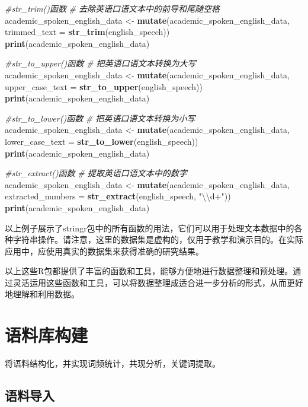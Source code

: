 \documentclass[]{book}
\newenvironment{Shaded}{\begin{snugshade}}{\end{snugshade}}
\newcommand{\CharTok}[1]{\textcolor[rgb]{0.31,0.60,0.02}{#1}}
\newcommand{\CommentTok}[1]{\textcolor[rgb]{0.56,0.35,0.01}{\textit{#1}}}
\newcommand{\DataTypeTok}[1]{\textcolor[rgb]{0.13,0.29,0.53}{#1}}
\newcommand{\KeywordTok}[1]{\textcolor[rgb]{0.13,0.29,0.53}{\textbf{#1}}}
\newcommand{\NormalTok}[1]{#1}
\newcommand{\StringTok}[1]{\textcolor[rgb]{0.31,0.60,0.02}{#1}}
\begin{document}
\begin{Shaded}
\begin{Highlighting}[]
\CommentTok{#str_trim()函数}
\CommentTok{# 去除英语口语文本中的前导和尾随空格}
\NormalTok{academic_spoken_english_data <-}\StringTok{ }\KeywordTok{mutate}\NormalTok{(academic_spoken_english_data, }\DataTypeTok{trimmed_text =} \KeywordTok{str_trim}\NormalTok{(english_speech))}
\KeywordTok{print}\NormalTok{(academic_spoken_english_data)}

\CommentTok{#str_to_upper()函数}
\CommentTok{# 把英语口语文本转换为大写}
\NormalTok{academic_spoken_english_data <-}\StringTok{ }\KeywordTok{mutate}\NormalTok{(academic_spoken_english_data, }\DataTypeTok{upper_case_text =} \KeywordTok{str_to_upper}\NormalTok{(english_speech))}
\KeywordTok{print}\NormalTok{(academic_spoken_english_data)}

\CommentTok{#str_to_lower()函数}
\CommentTok{# 把英语口语文本转换为小写}
\NormalTok{academic_spoken_english_data <-}\StringTok{ }\KeywordTok{mutate}\NormalTok{(academic_spoken_english_data, }\DataTypeTok{lower_case_text =} \KeywordTok{str_to_lower}\NormalTok{(english_speech))}
\KeywordTok{print}\NormalTok{(academic_spoken_english_data)}

\CommentTok{#str_extract()函数}
\CommentTok{# 提取英语口语文本中的数字}
\NormalTok{academic_spoken_english_data <-}\StringTok{ }\KeywordTok{mutate}\NormalTok{(academic_spoken_english_data, }\DataTypeTok{extracted_numbers =} \KeywordTok{str_extract}\NormalTok{(english_speech, }\StringTok{"}\CharTok{\textbackslash{}\textbackslash{}}\StringTok{d+"}\NormalTok{))}
\KeywordTok{print}\NormalTok{(academic_spoken_english_data)}
\end{Highlighting}
\end{Shaded}

以上例子展示了stringr包中的所有函数的用法，它们可以用于处理文本数据中的各种字符串操作。请注意，这里的数据集是虚构的，仅用于教学和演示目的。在实际应用中，应使用真实的数据集来获得准确的研究结果。

以上这些R包都提供了丰富的函数和工具，能够方便地进行数据整理和预处理。通过灵活运用这些函数和工具，可以将数据整理成适合进一步分析的形式，从而更好地理解和利用数据。

\hypertarget{ux8bedux6599ux5e93ux6784ux5efa}{%
\section{语料库构建}\label{ux8bedux6599ux5e93ux6784ux5efa}}

将语料结构化，并实现词频统计，共现分析，关键词提取。

\hypertarget{ux8bedux6599ux5bfcux5165}{%
\subsection{语料导入}\label{ux8bedux6599ux5bfcux5165}}
\end{document}

